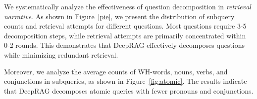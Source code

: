 We systematically analyze the effectiveness of question decomposition in \textit{retrieval narrative}. 
As shown in Figure~\ref{pie}, we present the distribution of subquery counts and retrieval attempts for different questions. Most questions require 3-5 decomposition steps, while retrieval attempts are primarily concentrated within 0-2 rounds. This demonstrates that DeepRAG effectively decomposes questions while minimizing redundant retrieval.




Moreover, we analyze the average counts of WH-words, nouns, verbs, and conjunctions in subqueries, as shown in Figure~\ref{fig:atomic}. The results indicate that DeepRAG decomposes atomic queries with fewer pronouns and conjunctions.



